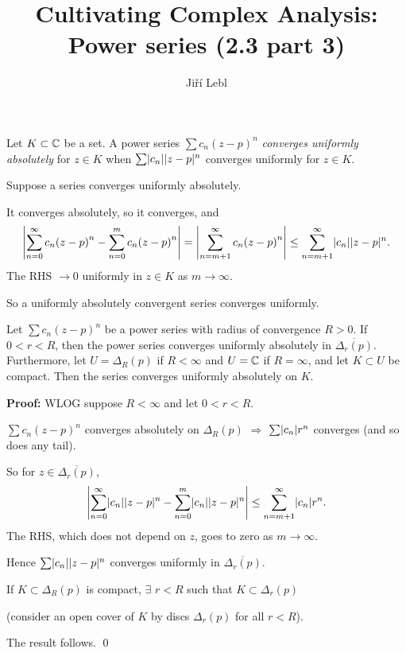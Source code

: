 \documentclass[10pt,aspectratio=169]{beamer}
\author{Ji\v{r}\'i Lebl}
\institute[OSU]{%
Departemento pri Matematiko de Oklahoma {\^S}tata Universitato}
\title{Cultivating Complex Analysis:\\%
Power series (2.3 part 3)}
\date{}
\begin{document}
\begin{frame}
\titlepage
\end{frame}

\begin{frame}
Let $K \subset {\mathbb{C}}$ be a set.
A power series $\sum c_n {(z-p)}^n$
\emph{converges uniformly absolutely}
for $z \in K$ when $\sum \lvert {c_n} \rvert \lvert {z-p} \rvert^n$
converges uniformly for $z \in K$.

\medskip
\pause

Suppose a series converges uniformly absolutely.

\medskip
\pause

It converges absolutely, so it converges, \pause and 
\[
\left\lvert {
\sum_{n=0}^\infty c_n {(z-p)}^n
-
\sum_{n=0}^{m} c_n {(z-p)}^n
} \right\rvert
=
\left\lvert {\sum_{n=m+1}^\infty c_n {(z-p)}^n} \right\rvert \leq
\sum_{n=m+1}^\infty \lvert {c_n} \rvert \lvert {z-p} \rvert^n .
\]
\pause
The RHS $\to 0$ uniformly in $z \in K$ as $m \to \infty$.

\medskip
\pause

So a uniformly absolutely convergent series converges uniformly.
\end{frame}

\begin{frame}

\begin{proposition}
Let $\sum c_n {(z-p)}^n$ be a power series with radius of convergence $R
> 0$.  If $0 < r < R$, then the power series converges uniformly absolutely
in $\overline{\Delta_r(p)}$.
\pause
Furthermore, let $U = \Delta_R(p)$ if $R < \infty$ and
$U = {\mathbb{C}}$ if $R=\infty$, and let $K \subset U$ be compact.
Then the series converges uniformly absolutely on $K$.
\end{proposition}

\pause

\textbf{Proof:}
WLOG suppose $R < \infty$ and let $0 < r < R$.

\medskip
\pause

$\sum c_n {(z-p)}^n$ converges absolutely
on $\Delta_R(p)$ \quad $\Rightarrow$ \quad
$\sum \lvert {c_n} \rvert r^n$ converges (and so does any tail).

\medskip
\pause

So for $z \in \overline{\Delta_r(p)}$,
\[
\left\lvert {
\sum_{n=0}^\infty \lvert {c_n} \rvert \lvert {z-p} \rvert^n
-
\sum_{n=0}^{m} \lvert {c_n} \rvert \lvert {z-p} \rvert^n
} \right\rvert
\leq
\sum_{n=m+1}^\infty \lvert {c_n} \rvert r^n .
\]
\pause
The RHS, which does not depend on $z$,
goes to zero as $m \to \infty$.

\pause

Hence $\sum \lvert {c_n} \rvert \lvert {z-p} \rvert^n$ converges uniformly in $\overline{\Delta_r(p)}$.

\medskip
\pause

If $K \subset \Delta_{R}(p)$ is compact, $\exists$ $r < R$ such
that $K \subset \Delta_r(p)$ \pause

(consider an open cover of $K$ by discs $\Delta_r(p)$ for all $r < R$).

\pause
\medskip

The result follows.
\qed
\end{frame}
\end{document}
